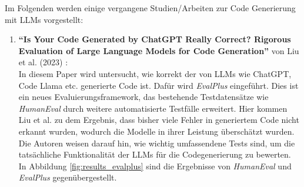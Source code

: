 \documentclass[11pt,a4paper]{article}
\begin{document}
Im Folgenden werden einige vergangene Studien/Arbeiten zur Code Generierung mit LLMs vorgestellt:
\begin{enumerate}
    \item \textbf{``Is Your Code Generated by ChatGPT Really Correct? Rigorous Evaluation of Large Language Models for Code Generation''} von Liu et al. (2023) \cite{NEURIPS2023_43e9d647}:\\
    In diesem Paper wird untersucht, wie korrekt der von LLMs wie ChatGPT, Code Llama etc. generierte Code ist. Dafür wird \emph{EvalPlus} eingeführt. Dies ist ein neues Evaluierungsframework, das bestehende Testdatensätze wie \emph{HumanEval} durch weitere automatisierte Testfälle erweitert. Hier kommen Liu et al. zu dem Ergebnis, dass bisher viele Fehler in generiertem Code nicht erkannt wurden, wodurch die Modelle in ihrer Leistung überschätzt wurden. Die Autoren weisen darauf hin, wie wichtig umfassendene Tests sind, um die tatsächliche Funktionalität der LLMs für die Codegenerierung zu bewerten. In Abbildung \ref{fig:results_evalplus} sind die Ergebnisse von \emph{HumanEval} und \emph{EvalPlus} gegenübergestellt.


\end{enumerate}
\end{document}

